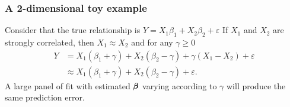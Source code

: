\documentclass[10pt, c, xcolor=x11names]{beamer}\usepackage[]{graphicx}\usepackage[]{color}
\begin{document}
\begin{frame}
  \frametitle{A 2-dimensional toy example}

  Consider that the true relationship is $Y = X_1 \beta_1 + X_2\beta_2
  +  \varepsilon$ If  $X_1$ and  $X_2$ are  strongly  correlated, then
  $X_1\approx X_2$ and for any $\gamma\geq 0$
  \begin{align*}
    Y & = X_1 (\beta_1 + \gamma) + X_2 (\beta_2 - \gamma) +
    \gamma(X_1-X_2) + \varepsilon \\
    & \approx X_1 (\beta_1 + \gamma) + X_2 (\beta_2 - \gamma) + \varepsilon.
  \end{align*}
  A large  panel of fit  with estimated $\boldsymbol\beta$ varying  according to
  $\gamma$ will produce the same prediction error.

  \vfill

\end{frame}
\end{document}
